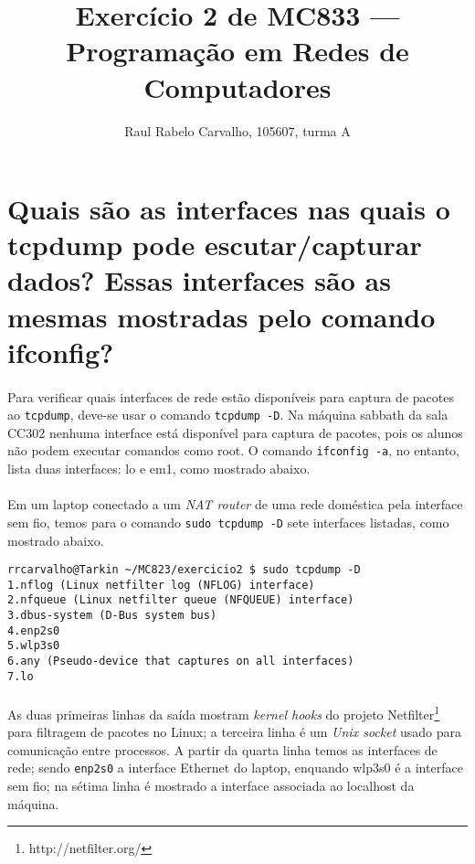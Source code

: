 \documentclass[a4paper,10pt,oneside,final,titlepage,onecolumn]{article}
\title{Exercício 2 de MC833 --- Programação em Redes de Computadores}
\author{Raul Rabelo Carvalho, 105607, turma A}
\begin{document}
\maketitle



\section{Quais são as interfaces nas quais o tcpdump pode escutar/capturar dados? Essas interfaces são as mesmas mostradas pelo comando ifconfig?}
\paragraph{}Para verificar quais interfaces de rede estão disponíveis para captura de pacotes ao \verb|tcpdump|, deve-se usar o comando \verb|tcpdump -D|. Na máquina sabbath da sala CC302 nenhuma interface está disponível para captura de pacotes, pois os alunos não podem executar comandos como root. O comando \verb|ifconfig -a|, no entanto, lista duas interfaces: lo e em1, como mostrado abaixo.
\paragraph{}Em um laptop conectado a um \emph{NAT router} de uma rede doméstica pela interface sem fio, temos para o comando \verb|sudo tcpdump -D| sete interfaces listadas, como mostrado abaixo.
\begin{lstlisting}
rrcarvalho@Tarkin ~/MC823/exercicio2 $ sudo tcpdump -D
1.nflog (Linux netfilter log (NFLOG) interface)
2.nfqueue (Linux netfilter queue (NFQUEUE) interface)
3.dbus-system (D-Bus system bus)
4.enp2s0
5.wlp3s0
6.any (Pseudo-device that captures on all interfaces)
7.lo
\end{lstlisting}
\paragraph{}As duas primeiras linhas da saída mostram \emph{kernel hooks} do projeto Netfilter\footnote{http://netfilter.org/} para filtragem de pacotes no Linux; a terceira linha é um \emph{Unix socket} usado para comunicação entre processos. A partir da quarta linha temos as interfaces de rede; sendo \verb|enp2s0| a interface Ethernet do laptop, enquando wlp3s0 é a interface sem fio; na sétima linha é mostrado a interface associada ao localhost da máquina.
\end{document}
